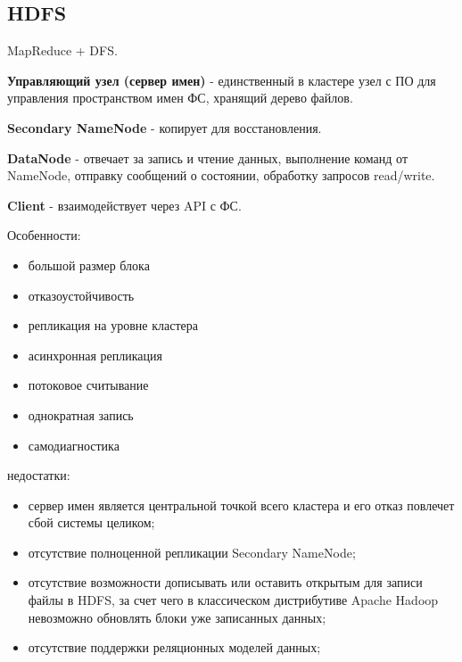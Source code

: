 \subsection*{HDFS}


MapReduce + DFS.

\textbf{Управляющий узел (сервер имен)} - единственный в
кластере узел с ПО для управления пространством имен ФС,
хранящий дерево файлов.

\textbf{Secondary NameNode} - копирует для восстановления.

\textbf{DataNode} - отвечает за запись и чтение данных,
выполнение команд от NameNode, отправку сообщений о состоянии,
обработку запросов read/write.

\textbf{Client} - взаимодействует через API с ФС.

Особенности:
\begin{itemize}
	\item большой размер блока
	\item отказоустойчивость
	\item репликация на уровне кластера
	\item асинхронная репликация
	\item потоковое считывание
	\item однократная запись
	\item самодиагностика
\end{itemize}

недостатки:
\begin{itemize}
	\item сервер имен является центральной точкой всего кластера и его
	отказ повлечет сбой системы целиком;
	\item отсутствие полноценной репликации Secondary NameNode;
	\item отсутствие возможности дописывать или оставить открытым
	для записи файлы в HDFS, за счет чего в классическом
	дистрибутиве Apache Hadoop невозможно обновлять блоки уже
	записанных данных;
	\item отсутствие поддержки реляционных моделей данных;
\end{itemize}